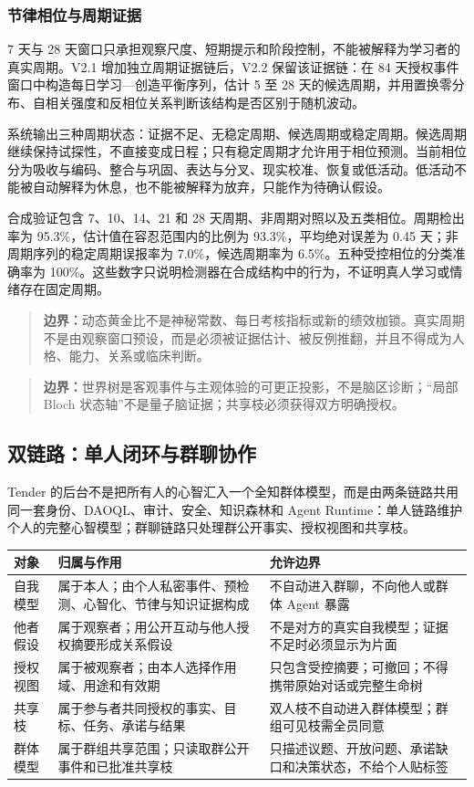 \documentclass[UTF8,a4paper,11pt]{ctexart}
\newcommand{\boundary}[1]{\begin{quote}\noindent\textbf{\color{TenderPink}边界：}#1\end{quote}}
\begin{document}
\subsubsection{节律相位与周期证据}

7 天与 28 天窗口只承担观察尺度、短期提示和阶段控制，不能被解释为学习者的真实周期。V2.1 增加独立周期证据链后，V2.2 保留该证据链：在 84 天授权事件窗口中构造每日学习—创造平衡序列，估计 5 至 28 天的候选周期，并用置换零分布、自相关强度和反相位关系判断该结构是否区别于随机波动。

系统输出三种周期状态：证据不足、无稳定周期、候选周期或稳定周期。候选周期继续保持试探性，不直接变成日程；只有稳定周期才允许用于相位预测。当前相位分为吸收与编码、整合与巩固、表达与分叉、现实校准、恢复或低活动。低活动不能被自动解释为休息，也不能被解释为放弃，只能作为待确认假设。

合成验证包含 7、10、14、21 和 28 天周期、非周期对照以及五类相位。周期检出率为 95.3\%，估计值在容忍范围内的比例为 93.3\%，平均绝对误差为 0.45 天；非周期序列的稳定周期误报率为 7.0\%，候选周期率为 6.5\%。五种受控相位的分类准确率为 100\%。这些数字只说明检测器在合成结构中的行为，不证明真人学习或情绪存在固定周期。

\boundary{动态黄金比不是神秘常数、每日考核指标或新的绩效枷锁。真实周期不是由观察窗口预设，而是必须被证据估计、被反例推翻，并且不得成为人格、能力、关系或临床判断。}

\boundary{世界树是客观事件与主观体验的可更正投影，不是脑区诊断；“局部 Bloch 状态轴”不是量子脑证据；共享枝必须获得双方明确授权。}

\subsection{双链路：单人闭环与群聊协作}

Tender 的后台不是把所有人的心智汇入一个全知群体模型，而是由两条链路共用同一套身份、DAOQL、审计、安全、知识森林和 Agent Runtime：单人链路维护个人的完整心智模型；群聊链路只处理群公开事实、授权视图和共享枝。

\begin{center}
\begin{longtable}{@{}p{3.2cm}p{4.8cm}p{5.0cm}@{}}
\toprule
\textbf{对象} & \textbf{归属与作用} & \textbf{允许边界} \\
\midrule
自我模型 & 属于本人；由个人私密事件、预检测、心智化、节律与知识证据构成 & 不自动进入群聊，不向他人或群体 Agent 暴露 \\
他者假设 & 属于观察者；用公开互动与他人授权摘要形成关系假设 & 不是对方的真实自我模型；证据不足时必须显示为片面 \\
授权视图 & 属于被观察者；由本人选择作用域、用途和有效期 & 只包含受控摘要；可撤回；不得携带原始对话或完整生命树 \\
共享枝 & 属于参与者共同授权的事实、目标、任务、承诺与结果 & 双人枝不自动进入群体模型；群组可见枝需全员同意 \\
群体模型 & 属于群组共享范围；只读取群公开事件和已批准共享枝 & 只描述议题、开放问题、承诺缺口和决策状态，不给个人贴标签 \\
\bottomrule
\end{longtable}
\end{center}
\end{document}
